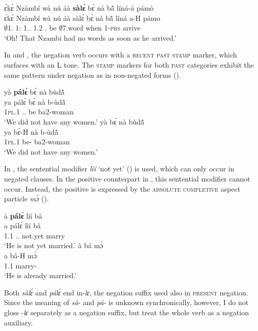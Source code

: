 \ea\label{sale}
  \glll ɛ́kɛ̀ Nzàmbí wà nú áà {\bfseries sàlɛ́} bɛ̀ nà bã̂ líná-á pámò \\
      ɛ́kɛ̀ Nzàmbí wà nú áà sàlɛ́ bɛ̀ nà bã̂ líná a-H pámo\\
        {\EXCL} $\emptyset$1.{\PN} 1:{\ATT} 1.{\DEM}.{\DIST} 1.{\PST}2 {\NEG}.{\PST} be {\COM} $\emptyset$7.word when 1-\textsc{prs} arrive\\
    \trans `Oh! That Nzambi had no words as soon as he arrived.'
\z

\noindent In  and , the negation verb occurs with a \textsc{recent past} \textsc{stamp} marker, which surfaces with an L tone. The \textsc{stamp} markers for both \textsc{past} categories exhibit the same pattern under negation as in non-negated forms ().

\ea\label{pale1}
\ea \label{pale1a}
  \glll  yà {\bfseries pálɛ́} bɛ̀ nà bùdã̂\\
      ya pálɛ́ bɛ̀ nà b-ùdã̂ \\
        1\textsc{pl}.{\PST}1 {\NEG}.{\PST}.{\R} be {\COM} ba2-woman\\
    \trans `We did not have any women.'
\ex\label{pale1b}
  \glll  yà bɛ́ nà bùdã̂ \\
      ya  bɛ̀-H nà b-ùdã̂ \\
        1\textsc{pl}.{\PST}1 be-{\R} {\COM} ba2-woman\\
    \trans `We did not have any women.'
\z
\z

In , the sentential modifier {\itshape lìí}  `not yet' () is used, which can only occur in negated clauses. In the positive counterpart in , this sentential modifier cannot occur. Instead, the positive is expressed by the \textsc{absolute completive} aspect particle {\itshape mɔ̀} ().

\ea\label{pale2}
\ea \label{pale2a}
  \glll  à {\bfseries pálɛ́} lìí bâ \\
      a pálɛ́ lìí bâ \\
          1.{\PST}1 {\NEG}.{\PST}.{\R} not.yet marry\\
    \trans `He is not yet married.'
\ex\label{pale2b}
  \glll  à bá mɔ̀ \\
      a bâ-H mɔ̀ \\
          1.{\PST}1 marry-{\R} {\COMPL}  \\
    \trans `He is already married.'
\z
\z


Both {\itshape sàlɛ́} and {\itshape pálɛ́} end in-{\itshape lɛ}, the negation suffix used also in  \textsc{present} negation. Since the meaning of {\itshape sà}- and {\itshape pá}- is unknown synchronically, however, I do not gloss -{\itshape lɛ} separately as a negation suffix, but treat the whole verb as a negation auxiliary.

